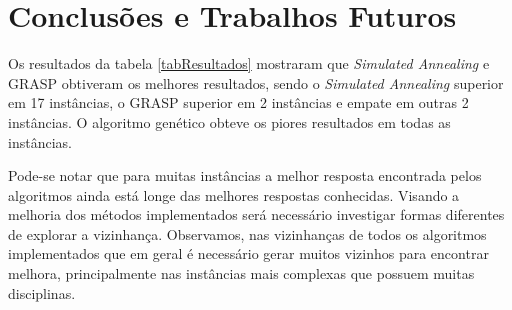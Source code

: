 \documentclass[11pt]{article}
\begin{document}


\section{Conclusões e Trabalhos Futuros}
\label{sec:conclusao}

Os resultados da tabela \ref{tabResultados} mostraram que \textit{Simulated Annealing} e GRASP obtiveram os melhores resultados, sendo o \textit{Simulated Annealing} superior em 17 instâncias, o GRASP superior em 2 instâncias e empate em outras 2 instâncias. O algoritmo genético obteve os piores resultados em todas as instâncias.

Pode-se notar que para muitas instâncias a melhor resposta encontrada pelos algoritmos ainda está longe das melhores respostas conhecidas. Visando a melhoria dos métodos implementados será necessário investigar formas diferentes de explorar a vizinhança. Observamos, nas vizinhanças de todos os algoritmos implementados que em geral é necessário gerar muitos vizinhos para encontrar melhora, principalmente nas instâncias mais complexas que possuem muitas disciplinas.
\end{document}
